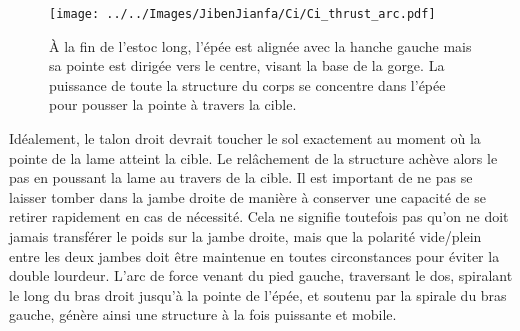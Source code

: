 \begin{figure}[ht]
\centering
	\texttt{[image: ../../Images/JibenJianfa/Ci/Ci\_thrust\_arc.pdf]}
	\caption[Estoc \Ci{} long]{\`{A} la fin de l'estoc \Ci{} long, l'épée est alignée avec la hanche gauche mais sa pointe est dirigée vers le centre, visant la base de la gorge. La puissance de toute la structure du corps se concentre dans l'épée pour pousser la pointe à travers la cible.}
	\label{fig:ci_thrust}
\end{figure}

Idéalement, le talon droit devrait toucher le sol exactement au moment où la pointe de la lame atteint la cible. Le relâchement de la structure achève alors le pas en poussant la lame au travers de la cible. Il est important de ne pas se laisser tomber dans la jambe droite de manière à conserver une capacité de se retirer rapidement en cas de nécessité. Cela ne signifie toutefois pas qu'on ne doit jamais transférer le poids sur la jambe droite, mais que la polarité vide/plein entre les deux jambes doit être maintenue en toutes circonstances pour éviter la double lourdeur. L'arc de force venant du pied gauche, traversant le dos, spiralant le long du bras droit jusqu'à la pointe de l'épée, et soutenu par la spirale du bras gauche, génère ainsi une structure à la fois puissante et mobile.
